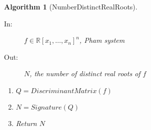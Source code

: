 \documentclass{article}%
\newtheorem{algorithm}[theorem]{Algorithm}
\begin{document}
\begin{algorithm}[NumberDistinctRealRoots]\ 

\begin{description}
\item[In:] $f\in\mathbb{R}\left[  x_{1},\ldots,x_{n}\right]  ^{n}$, Pham system

\item[Out:] $N$, the number of distinct real roots of $f$
\end{description}

\begin{enumerate}
\item $Q=DiscriminantMatrix\left(  f\right)  $

\item $N=Signature\left(  Q\right)  $

\item Return $N$
\end{enumerate}
\end{algorithm}
\end{document}
